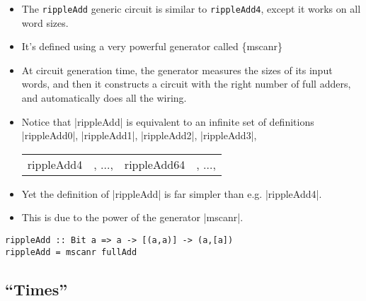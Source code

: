 \documentclass[11pt]{article}
\begin{document}
\begin{itemize}
\item The \texttt{rippleAdd} generic circuit is similar to
\texttt{rippleAdd4}, except it works on all word sizes.

\item It's defined using a very powerful generator called \{\color{red}mscanr\}

\item At circuit generation time, the generator measures the sizes of
its input words, and then it constructs a circuit with the right
number of full adders, and automatically does all the wiring.

\item Notice that |rippleAdd| is equivalent to an infinite set of
definitions |rippleAdd0|, |rippleAdd1|, |rippleAdd2|, |rippleAdd3|,
\begin{center}
\begin{tabular}{llll}
rippleAdd4 & , \(\ldots\), & rippleAdd64 & , \(\ldots\),\\[0pt]
\end{tabular}
\end{center}

\item Yet the definition of |rippleAdd| is far simpler than
e.g. |rippleAdd4|.

\item This is due to the power of the generator |mscanr|.
\end{itemize}

\begin{verbatim}
rippleAdd :: Bit a => a -> [(a,a)] -> (a,[a])
rippleAdd = mscanr fullAdd
\end{verbatim}

\subsection{``Times''}
\label{sec:orga11faf4}
\end{document}
